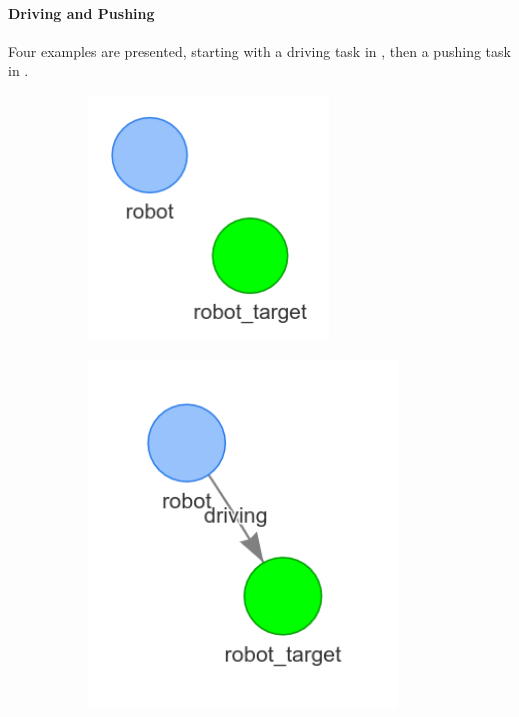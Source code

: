 \paragraph{Driving and Pushing} Four examples are presented, starting with a driving task in , then a pushing task in .\bs

\begin{figure}[H]
    \centering
    \begin{subfigure}{.3\textwidth}
    \centering
    \includegraphics[width=0.7\textwidth]{figures/proposed_method/connecting_nodes/robot_to_target/robot_to_target}
    \end{subfigure}
    \begin{subfigure}{.3\textwidth}
    \centering
    \includegraphics[width=0.9\textwidth]{figures/proposed_method/connecting_nodes/robot_to_target/robot_drive_target}

\end{subfigure}
\end{figure}
